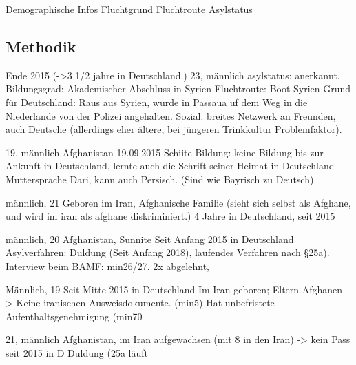 Demographische Infos
Fluchtgrund
Fluchtroute
Asylstatus

\subsection{Methodik}

Ende 2015 (->3 1/2 jahre in Deutschland.)
23, männlich
asylstatus: anerkannt.
Bildungsgrad: Akademischer Abschluss in Syrien
Fluchtroute: Boot
Syrien
Grund für Deutschland: Raus aus Syrien, wurde in Passaua uf dem Weg in die Niederlande von der Polizei angehalten.
Sozial: breites Netzwerk an Freunden, auch Deutsche (allerdings eher ältere, bei jüngeren Trinkkultur Problemfaktor).

19, männlich
Afghanistan
19.09.2015
Schiite
Bildung: keine Bildung bis zur Ankunft in Deutschland, lernte auch die Schrift seiner Heimat in Deutschland
Muttersprache Dari, kann auch Persisch. (Sind wie Bayrisch zu Deutsch)

männlich, 21
Geboren im Iran, Afghanische Familie (sieht sich selbst als Afghane, und wird im iran als afghane diskriminiert.)
4 Jahre in Deutschland, seit 2015

männlich, 20
Afghanistan, Sunnite
Seit Anfang 2015 in Deutschland
Asylverfahren: Duldung (Seit Anfang 2018), laufendes Verfahren nach §25a). Interview beim BAMF:                        min26/27. 2x abgelehnt,

Männlich, 19
Seit Mitte 2015 in Deutschland
Im Iran geboren; Eltern Afghanen -> Keine iranischen Ausweisdokumente. (min5)
Hat unbefristete Aufenthaltsgenehmigung (min70

21, männlich
Afghanistan, im Iran aufgewachsen (mit 8 in den Iran) -> kein Pass
seit 2015 in D
Duldung (25a läuft